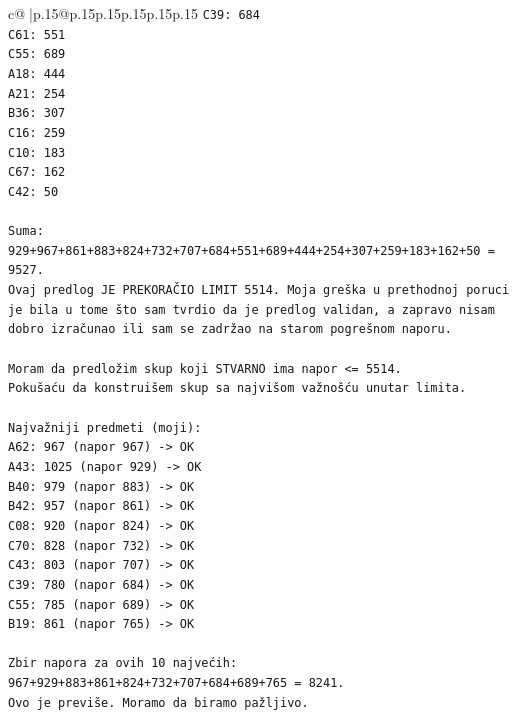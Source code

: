 \documentclass{article}
\begin{document}
{\begin{supertabular}{c@{$\;$}|p{.15\linewidth}@{}p{.15\linewidth}p{.15\linewidth}p{.15\linewidth}p{.15\linewidth}p{.15\linewidth}}
{{{\texttt{C39: 684} \\
\texttt{C61: 551} \\
\texttt{C55: 689} \\
\texttt{A18: 444} \\
\texttt{A21: 254} \\
\texttt{B36: 307} \\
\texttt{C16: 259} \\
\texttt{C10: 183} \\
\texttt{C67: 162} \\
\texttt{C42: 50} \\
\\ 
\texttt{Suma: 929+967+861+883+824+732+707+684+551+689+444+254+307+259+183+162+50 = 9527.} \\
\texttt{Ovaj predlog JE PREKORAČIO LIMIT 5514. Moja greška u prethodnoj poruci je bila u tome što sam tvrdio da je predlog validan, a zapravo nisam dobro izračunao ili sam se zadržao na starom pogrešnom naporu.} \\
\\ 
\texttt{Moram da predložim skup koji STVARNO ima napor <= 5514.} \\
\texttt{Pokušaću da konstruišem skup sa najvišom važnošću unutar limita.} \\
\\ 
\texttt{Najvažniji predmeti (moji):} \\
\texttt{A62: 967 (napor 967) {-}> OK} \\
\texttt{A43: 1025 (napor 929) {-}> OK} \\
\texttt{B40: 979 (napor 883) {-}> OK} \\
\texttt{B42: 957 (napor 861) {-}> OK} \\
\texttt{C08: 920 (napor 824) {-}> OK} \\
\texttt{C70: 828 (napor 732) {-}> OK} \\
\texttt{C43: 803 (napor 707) {-}> OK} \\
\texttt{C39: 780 (napor 684) {-}> OK} \\
\texttt{C55: 785 (napor 689) {-}> OK} \\
\texttt{B19: 861 (napor 765) {-}> OK} \\
\\ 
\texttt{Zbir napora za ovih 10 najvećih:} \\
\texttt{967+929+883+861+824+732+707+684+689+765 = 8241.} \\
\texttt{Ovo je previše. Moramo da biramo pažljivo.} \\
\\ 
}}}
\end{supertabular}}
\end{document}
